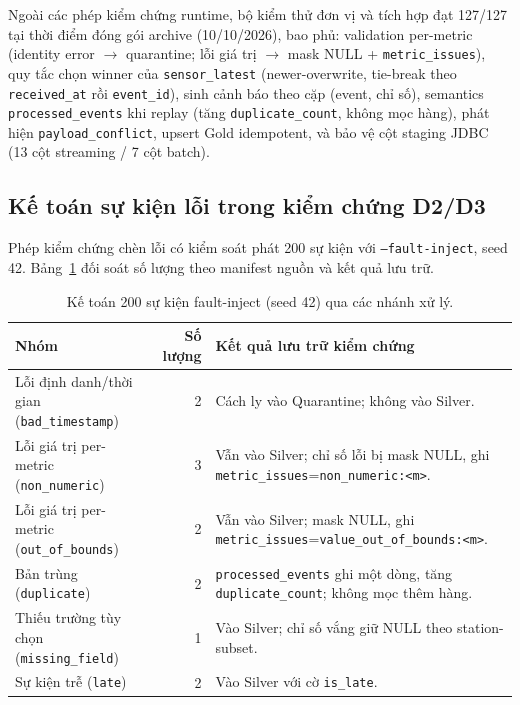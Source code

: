 Ngoài các phép kiểm chứng runtime, bộ kiểm thử đơn vị và tích hợp đạt 127/127 tại thời điểm đóng gói archive (10/10/2026), bao phủ: validation per-metric (identity error $\rightarrow$ quarantine; lỗi giá trị $\rightarrow$ mask NULL + \texttt{metric\_issues}), quy tắc chọn winner của \texttt{sensor\_latest} (newer-overwrite, tie-break theo \texttt{received\_at} rồi \texttt{event\_id}), sinh cảnh báo theo cặp (event, chỉ số), semantics \texttt{processed\_events} khi replay (tăng \texttt{duplicate\_count}, không mọc hàng), phát hiện \texttt{payload\_conflict}, upsert Gold idempotent, và bảo vệ cột staging JDBC (13 cột streaming / 7 cột batch).

\subsection{Kế toán sự kiện lỗi trong kiểm chứng D2/D3}
\label{subsec:d23-detail}
Phép kiểm chứng chèn lỗi có kiểm soát phát 200 sự kiện với \texttt{--fault-inject}, seed 42. Bảng~\ref{tab:d23-accounting} đối soát số lượng theo manifest nguồn và kết quả lưu trữ.

\begin{table}[H]
\centering
\caption{Kế toán 200 sự kiện fault-inject (seed 42) qua các nhánh xử lý.}
\label{tab:d23-accounting}
\small
\begin{tabularx}{\textwidth}{>{\raggedright\arraybackslash}p{4.3cm} r >{\raggedright\arraybackslash}X}
\toprule
\textbf{Nhóm} & \textbf{Số lượng} & \textbf{Kết quả lưu trữ kiểm chứng} \\
\midrule
Lỗi định danh/thời gian (\texttt{bad\_timestamp}) & 2 & Cách ly vào Quarantine; không vào Silver. \\
Lỗi giá trị per-metric (\texttt{non\_numeric}) & 3 & Vẫn vào Silver; chỉ số lỗi bị mask NULL, ghi \texttt{metric\_issues}=\texttt{non\_numeric:<m>}. \\
Lỗi giá trị per-metric (\texttt{out\_of\_bounds}) & 2 & Vẫn vào Silver; mask NULL, ghi \texttt{metric\_issues}=\texttt{value\_out\_of\_bounds:<m>}. \\
Bản trùng (\texttt{duplicate}) & 2 & \texttt{processed\_events} ghi một dòng, tăng \texttt{duplicate\_count}; không mọc thêm hàng. \\
Thiếu trường tùy chọn (\texttt{missing\_field}) & 1 & Vào Silver; chỉ số vắng giữ NULL theo station-subset. \\
Sự kiện trễ (\texttt{late}) & 2 & Vào Silver với cờ \texttt{is\_late}. \\
\bottomrule
\end{tabularx}
\end{table}

